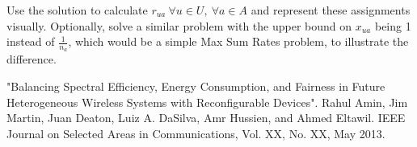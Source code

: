 \documentclass[11pt]{article}
\begin{document}
 Use the solution to calculate $r_{ua} \ \forall u \in U, \ \forall a \in A$ and represent these assignments visually.
Optionally, solve a similar problem with the upper bound on $x_{ua}$ being 1 instead of $\frac{1}{n_a}$, which would be a simple Max Sum Rates problem, to illustrate the difference.

\begin{thebibliography}{9} 
"Balancing Spectral Efficiency, Energy Consumption,
and Fairness in Future Heterogeneous Wireless
Systems with Reconfigurable Devices". Rahul Amin, Jim Martin, Juan Deaton, Luiz A. DaSilva, Amr Hussien, and Ahmed Eltawil. IEEE Journal on Selected Areas in Communications, Vol. XX, No. XX, May 2013.
\end{thebibliography}
\end{document}
